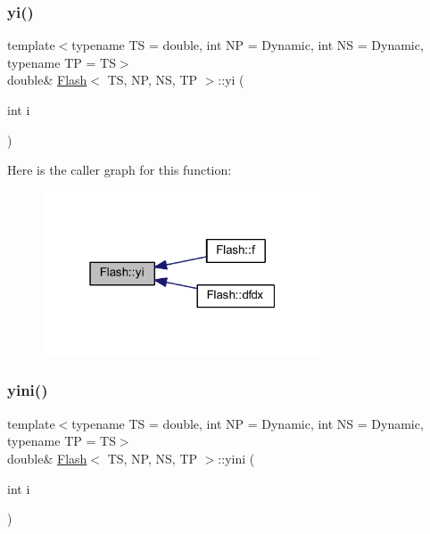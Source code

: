 \subsubsection{\texorpdfstring{yi()}{yi()}}
{\footnotesize\ttfamily template$<$typename TS = double, int NP = Dynamic, int NS = Dynamic, typename TP = TS$>$ \\
double\& \mbox{\hyperlink{class_flash}{Flash}}$<$ TS, NP, NS, TP $>$\+::yi (\begin{DoxyParamCaption}\item[{int}]{i }\end{DoxyParamCaption})\hspace{0.3cm}{\ttfamily [inline]}}

Here is the caller graph for this function\+:
\nopagebreak
\begin{figure}[H]
\begin{center}
\leavevmode
\includegraphics[width=235pt]{class_flash_a2af985b9562aa54cbc5c3dfd2f4292ef_icgraph}
\end{center}
\end{figure}
\mbox{\label{class_flash_a5bebef2024531af739160f0fc23e3086}} 
\subsubsection{\texorpdfstring{yini()}{yini()}}
{\footnotesize\ttfamily template$<$typename TS = double, int NP = Dynamic, int NS = Dynamic, typename TP = TS$>$ \\
double\& \mbox{\hyperlink{class_flash}{Flash}}$<$ TS, NP, NS, TP $>$\+::yini (\begin{DoxyParamCaption}\item[{int}]{i }\end{DoxyParamCaption})\hspace{0.3cm}{\ttfamily [inline]}}

